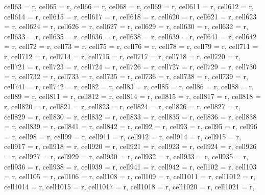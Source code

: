 \begin{table}
{\begin{tblr}
{  cell{6}{3} = {r},
  cell{6}{5} = {r},
  cell{6}{6} = {r},
  cell{6}{8} = {r},
  cell{6}{9} = {r},
  cell{6}{11} = {r},
  cell{6}{12} = {r},
  cell{6}{14} = {r},
  cell{6}{15} = {r},
  cell{6}{17} = {r},
  cell{6}{18} = {r},
  cell{6}{20} = {r},
  cell{6}{21} = {r},
  cell{6}{23} = {r},
  cell{6}{24} = {r},
  cell{6}{26} = {r},
  cell{6}{27} = {r},
  cell{6}{29} = {r},
  cell{6}{30} = {r},
  cell{6}{32} = {r},
  cell{6}{33} = {r},
  cell{6}{35} = {r},
  cell{6}{36} = {r},
  cell{6}{38} = {r},
  cell{6}{39} = {r},
  cell{6}{41} = {r},
  cell{6}{42} = {r},
  cell{7}{2} = {r},
  cell{7}{3} = {r},
  cell{7}{5} = {r},
  cell{7}{6} = {r},
  cell{7}{8} = {r},
  cell{7}{9} = {r},
  cell{7}{11} = {r},
  cell{7}{12} = {r},
  cell{7}{14} = {r},
  cell{7}{15} = {r},
  cell{7}{17} = {r},
  cell{7}{18} = {r},
  cell{7}{20} = {r},
  cell{7}{21} = {r},
  cell{7}{23} = {r},
  cell{7}{24} = {r},
  cell{7}{26} = {r},
  cell{7}{27} = {r},
  cell{7}{29} = {r},
  cell{7}{30} = {r},
  cell{7}{32} = {r},
  cell{7}{33} = {r},
  cell{7}{35} = {r},
  cell{7}{36} = {r},
  cell{7}{38} = {r},
  cell{7}{39} = {r},
  cell{7}{41} = {r},
  cell{7}{42} = {r},
  cell{8}{2} = {r},
  cell{8}{3} = {r},
  cell{8}{5} = {r},
  cell{8}{6} = {r},
  cell{8}{8} = {r},
  cell{8}{9} = {r},
  cell{8}{11} = {r},
  cell{8}{12} = {r},
  cell{8}{14} = {r},
  cell{8}{15} = {r},
  cell{8}{17} = {r},
  cell{8}{18} = {r},
  cell{8}{20} = {r},
  cell{8}{21} = {r},
  cell{8}{23} = {r},
  cell{8}{24} = {r},
  cell{8}{26} = {r},
  cell{8}{27} = {r},
  cell{8}{29} = {r},
  cell{8}{30} = {r},
  cell{8}{32} = {r},
  cell{8}{33} = {r},
  cell{8}{35} = {r},
  cell{8}{36} = {r},
  cell{8}{38} = {r},
  cell{8}{39} = {r},
  cell{8}{41} = {r},
  cell{8}{42} = {r},
  cell{9}{2} = {r},
  cell{9}{3} = {r},
  cell{9}{5} = {r},
  cell{9}{6} = {r},
  cell{9}{8} = {r},
  cell{9}{9} = {r},
  cell{9}{11} = {r},
  cell{9}{12} = {r},
  cell{9}{14} = {r},
  cell{9}{15} = {r},
  cell{9}{17} = {r},
  cell{9}{18} = {r},
  cell{9}{20} = {r},
  cell{9}{21} = {r},
  cell{9}{23} = {r},
  cell{9}{24} = {r},
  cell{9}{26} = {r},
  cell{9}{27} = {r},
  cell{9}{29} = {r},
  cell{9}{30} = {r},
  cell{9}{32} = {r},
  cell{9}{33} = {r},
  cell{9}{35} = {r},
  cell{9}{36} = {r},
  cell{9}{38} = {r},
  cell{9}{39} = {r},
  cell{9}{41} = {r},
  cell{9}{42} = {r},
  cell{10}{2} = {r},
  cell{10}{3} = {r},
  cell{10}{5} = {r},
  cell{10}{6} = {r},
  cell{10}{8} = {r},
  cell{10}{9} = {r},
  cell{10}{11} = {r},
  cell{10}{12} = {r},
  cell{10}{14} = {r},
  cell{10}{15} = {r},
  cell{10}{17} = {r},
  cell{10}{18} = {r},
  cell{10}{20} = {r},
  cell{10}{21} = {r},
}
\end{tblr}}
\end{table}
